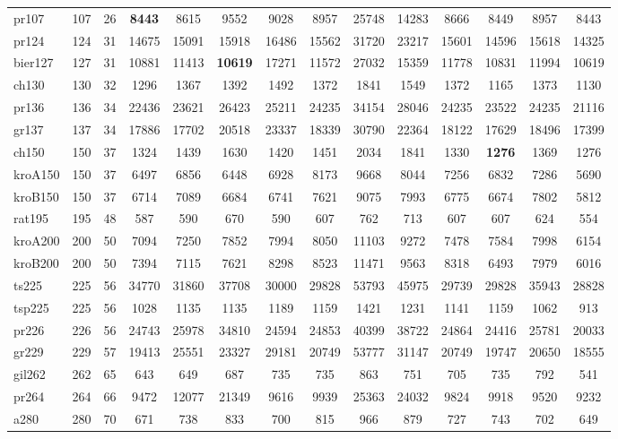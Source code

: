 \documentclass[conference]{IEEEtran}
\begin{document}
\begin{table}[htbp]
{{\begin{tabular}{|l|c|c|c|c|c|c|c|c|c|c|c|c|c|}
pr107 & 107 & 26 & \textbf{8443} & 8615 & 9552 & 9028 & 8957 & 25748 & 14283 & 8666 & 8449 & 8957 & 8443 \\
pr124 & 124 & 31 & 14675 & 15091 & 15918 & 16486 & 15562 & 31720 & 23217 & 15601 & 14596 & 15618 & 14325 \\
bier127 & 127 & 31 & 10881 & 11413 & \textbf{10619} & 17271 & 11572 & 27032 & 15359 & 11778 & 10831 & 11994 & 10619 \\
ch130 & 130 & 32 & 1296 & 1367 & 1392 & 1492 & 1372 & 1841 & 1549 & 1372 & 1165 & 1373 & 1130 \\
pr136 & 136 & 34 & 22436 & 23621 & 26423 & 25211 & 24235 & 34154 & 28046 & 24235 & 23522 & 24235 & 21116 \\
gr137 & 137 & 34 & 17886 & 17702 & 20518 & 23337 & 18339 & 30790 & 22364 & 18122 & 17629 & 18496 & 17399 \\
ch150 & 150 & 37 & 1324 & 1439 & 1630 & 1420 & 1451 & 2034 & 1841 & 1330 & \textbf{1276} & 1369 & 1276 \\
kroA150 & 150 & 37 & 6497 & 6856 & 6448 & 6928 & 8173 & 9668 & 8044 & 7256 & 6832 & 7286 & 5690 \\
kroB150 & 150 & 37 & 6714 & 7089 & 6684 & 6741 & 7621 & 9075 & 7993 & 6775 & 6674 & 7802 & 5812 \\
rat195 & 195 & 48 & 587 & 590 & 670 & 590 & 607 & 762 & 713 & 607 & 607 & 624 & 554 \\
kroA200 & 200 & 50 & 7094 & 7250 & 7852 & 7994 & 8050 & 11103 & 9272 & 7478 & 7584 & 7998 & 6154 \\
kroB200 & 200 & 50 & 7394 & 7115 & 7621 & 8298 & 8523 & 11471 & 9563 & 8318 & 6493 & 7979 & 6016 \\
ts225 & 225 & 56 & 34770 & 31860 & 37708 & 30000 & 29828 & 53793 & 45975 & 29739 & 29828 & 35943 & 28828 \\
tsp225 & 225 & 56 & 1028 & 1135 & 1135 & 1189 & 1159 & 1421 & 1231 & 1141 & 1159 & 1062 & 913 \\
pr226 & 226 & 56 & 24743 & 25978 & 34810 & 24594 & 24853 & 40399 & 38722 & 24864 & 24416 & 25781 & 20033 \\
gr229 & 229 & 57 & 19413 & 25551 & 23327 & 29181 & 20749 & 53777 & 31147 & 20749 & 19747 & 20650 & 18555 \\
gil262 & 262 & 65 & 643 & 649 & 687 & 735 & 735 & 863 & 751 & 705 & 735 & 792 & 541 \\
pr264 & 264 & 66 & 9472 & 12077 & 21349 & 9616 & 9939 & 25363 & 24032 & 9824 & 9918 & 9520 & 9232 \\
a280 & 280 & 70 & 671 & 738 & 833 & 700 & 815 & 966 & 879 & 727 & 743 & 702 & 649 \\

\end{tabular}}}
\end{table}
\end{document}
